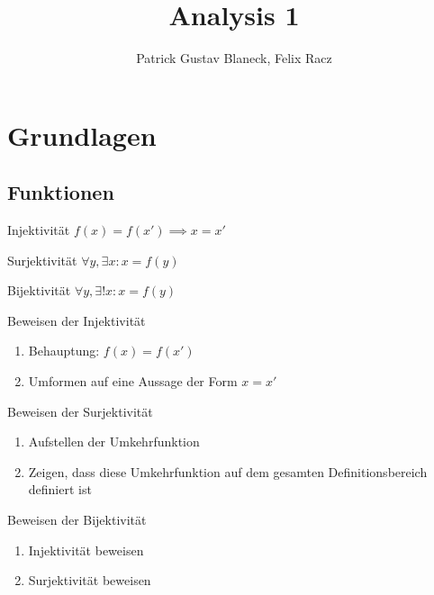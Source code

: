 \documentclass[german]{spicker}
\title{Analysis 1}
\author{Patrick Gustav Blaneck, Felix Racz}
\begin{document}
\maketitle
\tableofcontents
\newpage

\section{Grundlagen}
\subsection{Funktionen}
\begin{thirdboxl}
    \begin{defi}{Injektivität}
        $f(x) = f(x')\implies x = x'$
    \end{defi}
\end{thirdboxl}%
\begin{thirdboxm}
    \begin{defi}{Surjektivität}
        $\forall y, \exists x: x = f(y)$
    \end{defi}
\end{thirdboxm}%
\begin{thirdboxr}
    \begin{defi}{Bijektivität}
        $\forall y, \exists! x: x = f(y)$
    \end{defi}
\end{thirdboxr}%

\begin{algo}{Beweisen der Injektivität}
    \begin{enumerate}
        \item Behauptung: $f(x) = f(x')$
        \item Umformen auf eine Aussage der Form $x = x'$
    \end{enumerate}
\end{algo}

\begin{algo}{Beweisen der Surjektivität}
    \begin{enumerate}
        \item Aufstellen der Umkehrfunktion
        \item Zeigen, dass diese Umkehrfunktion auf dem gesamten Definitionsbereich definiert ist
    \end{enumerate}
\end{algo}

\begin{algo}{Beweisen der Bijektivität}
    \begin{enumerate}
        \item Injektivität beweisen
        \item Surjektivität beweisen
    \end{enumerate}
\end{algo}
\end{document}
